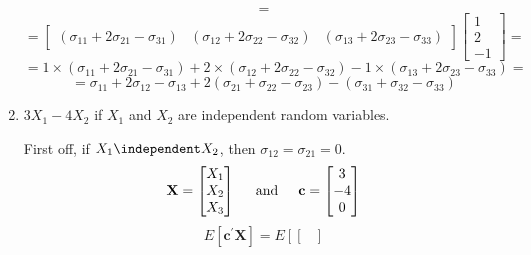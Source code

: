\begin{enumerate}[label=(\alph*)]
\[                =
            \]
            \[
                =
                \begin{bmatrix}
                    \left(\sigma_{11} + 2\sigma_{21} - \sigma_{31}\right) &
                    \left(\sigma_{12} + 2\sigma_{22} - \sigma_{32}\right) &
                    \left(\sigma_{13} + 2\sigma_{23} - \sigma_{33}\right)
                \end{bmatrix}
                \begin{bmatrix}
                    1 \\
                    2 \\
                    -1
                \end{bmatrix}
                =
            \]
            \[
                =
                1 \times \left(\sigma_{11} + 2\sigma_{21} - \sigma_{31}\right) + 2 \times \left(\sigma_{12} + 2\sigma_{22} - \sigma_{32}\right)
                    - 1 \times \left(\sigma_{13} + 2\sigma_{23} - \sigma_{33}\right)
                =
            \]
            \[
                =
                \sigma_{11} + 2 \sigma_{12} - \sigma_{13}
                +2(\sigma_{21} + \sigma_{22} - \sigma_{23})
                -(\sigma_{31} + \sigma_{32} - \sigma_{33})
            \]
            \item $3X_1 - 4X_2$ if $X_1$ and $X_2$ are independent random variables.
            \newline
            \par
            First off, if $X_1 \independent X_2$, then $\sigma_{12} = \sigma_{21} = 0$.
            \[
                \textbf{X}
                =
                \begin{bmatrix}
                    X_1 \\
                    X_2 \\
                    X_3
                \end{bmatrix}
                \hspace{0.2in}\text{and}\hspace{0.2in}
                \textbf{c}
                =
                \begin{bmatrix}
                    3 \\
                    -4 \\
                    0
                \end{bmatrix}
            \]
            \[
                E\left[\textbf{c}^\prime\textbf{X}\right]
                =
                E\left[
                \begin{bmatrix}

\end{bmatrix}\]
\end{enumerate}
